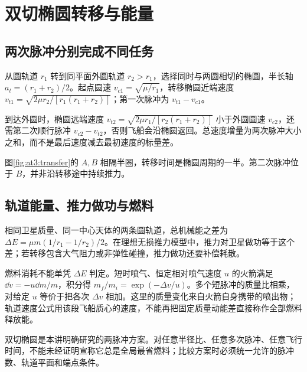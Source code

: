 \section{双切椭圆转移与能量}
\subsection{两次脉冲分别完成不同任务}

从圆轨道 $r_1$ 转到同平面外圆轨道 $r_2>r_1$，选择同时与两圆相切的椭圆，半长轴 $a_t=(r_1+r_2)/2$。起点圆速 $v_{c1}=\sqrt{\mu/r_1}$，转移椭圆近端速度 $v_{t1}=\sqrt{2\mu r_2/[r_1(r_1+r_2)]}$；第一次脉冲为 $v_{t1}-v_{c1}$。

到达外圆时，椭圆远端速度 $v_{t2}=\sqrt{2\mu r_1/[r_2(r_1+r_2)]}$ 小于外圆圆速 $v_{c2}$，还需第二次顺行脉冲 $v_{c2}-v_{t2}$，否则飞船会沿椭圆返回。总速度增量为两次脉冲大小之和，而不是最后速度减去最初速度的标量差。

图\ref{fig:at3:transfer}的 $A,B$ 相隔半圈，转移时间是椭圆周期的一半。第二次脉冲位于 $B$，并非沿转移途中持续推力。\subsection{轨道能量、推力做功与燃料}

相同卫星质量、同一中心天体的两条圆轨道，总机械能之差为 $\Delta E=\mu m(1/r_1-1/r_2)/2$。在理想无损推力模型中，推力对卫星做功等于这个差；若转移包含大气阻力或非弹性碰撞，推力做功还要补偿耗散。

燃料消耗不能单凭 $\Delta E$ 判定。短时喷气、恒定相对喷气速度 $u$ 的火箭满足 $\dd v=-u\dd m/m$，积分得 $m_f/m_i=\exp(-\Delta v/u)$。多个短脉冲的质量比相乘，对给定 $u$ 等价于把各次 $\Delta v$ 相加。这里的质量变化来自火箭自身携带的喷出物；轨道速度公式用该段飞船质心的速度，不能再把固定质量动能差直接称作全部燃料释放能。

双切椭圆是本讲明确研究的两脉冲方案。对任意半径比、任意多次脉冲、任意飞行时间，不能未经证明宣称它总是全局最省燃料；比较方案时必须统一允许的脉冲数、轨道平面和端点条件。


